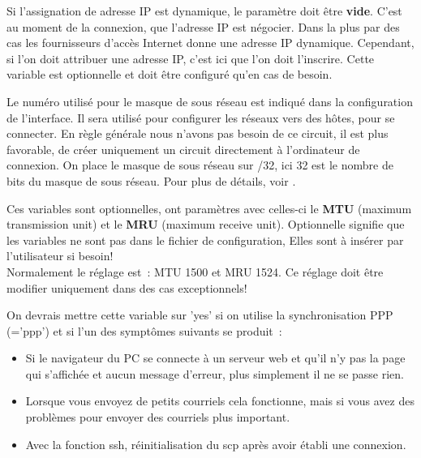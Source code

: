 \begin{description}
  Si l'\-assi\-gna\-tion de adresse IP est dynamique, le paramètre doit être
  \textbf{vide}. C'est au moment de la connexion, que l'adresse IP est négocier.
  Dans la plus par des cas les fournisseurs d'accès Internet donne une adresse IP
  dynamique. Cependant, si l'on doit attribuer une adresse IP, c'est ici que
  l'on doit l'inscrire. Cette variable est optionnelle et doit être configuré
  qu'en cas de besoin.

  Le numéro utilisé pour le masque de sous réseau est indiqué dans la configuration
  de l'interface. Il sera utilisé pour configurer les réseaux vers des hôtes, pour
  se connecter. En règle générale nous n'avons pas besoin de ce circuit, il est plus
  favorable, de créer uniquement un circuit directement à l'ordinateur de connexion.
  On place le masque de sous réseau sur /32, ici 32 est le nombre de bits du masque
  de sous réseau. Pour plus de détails, voir
  .


  Ces variables sont optionnelles, ont paramètres avec celles-ci le \textbf{MTU}
  (maximum transmission unit) et le \textbf{MRU} (maximum receive unit).
  Optionnelle signifie que les variables ne sont pas dans le fichier de configuration,
  Elles sont à insérer par l'utilisateur si besoin! \\
  Normalement le réglage est~: MTU 1500 et MRU 1524. Ce réglage doit être
  modifier uniquement dans des cas exceptionnels!


  On devrais mettre cette variable sur 'yes' si on utilise la synchronisation PPP
  (='ppp') et si l'un des symptômes suivants se produit~:
\begin{itemize}
\item Si le navigateur du PC se connecte à un serveur web et qu'il n'y pas la page
  qui s'affichée et aucun message d'erreur, plus simplement il ne se passe rien.
\item Lorsque vous envoyez de petits courriels cela fonctionne, mais si vous avez des
  problèmes pour envoyer des courriels plus important.
\item Avec la fonction ssh, réinitialisation du scp après avoir établi une connexion.
\end{itemize}


\end{description}
